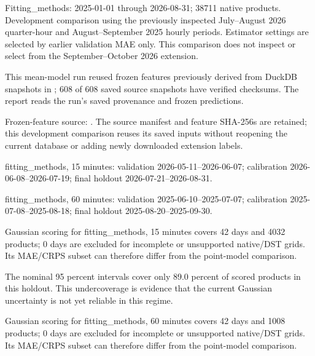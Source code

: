 \documentclass[11pt,a4paper]{article}
\begin{document}
Fitting\_methods: 2025-01-01 through 2026-08-31; 38711 native products. Development comparison using the previously inspected July–August 2026 quarter-hour and August–September 2025 hourly periods. Estimator settings are selected by earlier validation MAE only. This comparison does not inspect or select from the September–October 2026 extension.

This mean-model run reused frozen features previously derived from DuckDB snapshots in ; 608 of 608 saved source snapshots have verified checksums. The report reads the run's saved provenance and frozen predictions.

Frozen-feature source: . The source manifest and feature SHA-256s are retained; this development comparison reuses its saved inputs without reopening the current database or adding newly downloaded extension labels.

fitting\_methods, 15 minutes: validation 2026-05-11--2026-06-07; calibration 2026-06-08--2026-07-19; final holdout 2026-07-21--2026-08-31.

fitting\_methods, 60 minutes: validation 2025-06-10--2025-07-07; calibration 2025-07-08--2025-08-18; final holdout 2025-08-20--2025-09-30.

Gaussian scoring for fitting\_methods, 15 minutes covers 42 days and 4032 products; 0 days are excluded for incomplete or unsupported native/DST grids. Its MAE/CRPS subset can therefore differ from the point-model comparison.

The nominal 95 percent intervals cover only 89.0 percent of scored products in this holdout. This undercoverage is evidence that the current Gaussian uncertainty is not yet reliable in this regime.

Gaussian scoring for fitting\_methods, 60 minutes covers 42 days and 1008 products; 0 days are excluded for incomplete or unsupported native/DST grids. Its MAE/CRPS subset can therefore differ from the point-model comparison.
\end{document}
